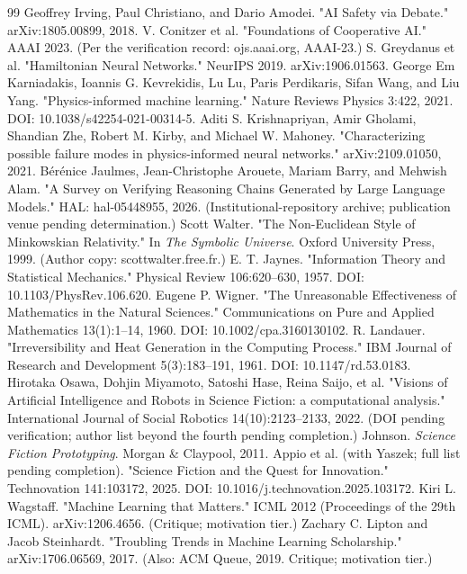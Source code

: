 \documentclass[11pt,a4paper]{article}
\begin{document}
\begin{thebibliography}{99}
 Geoffrey Irving, Paul Christiano, and Dario Amodei. "AI Safety via Debate." arXiv:1805.00899, 2018.
 V. Conitzer et al. "Foundations of Cooperative AI." AAAI 2023. (Per the verification record: ojs.aaai.org, AAAI-23.)
 S. Greydanus et al. "Hamiltonian Neural Networks." NeurIPS 2019. arXiv:1906.01563.
 George Em Karniadakis, Ioannis G. Kevrekidis, Lu Lu, Paris Perdikaris, Sifan Wang, and Liu Yang. "Physics-informed machine learning." Nature Reviews Physics 3:422, 2021. DOI: 10.1038/s42254-021-00314-5.
 Aditi S. Krishnapriyan, Amir Gholami, Shandian Zhe, Robert M. Kirby, and Michael W. Mahoney. "Characterizing possible failure modes in physics-informed neural networks." arXiv:2109.01050, 2021.
 Bérénice Jaulmes, Jean-Christophe Arouete, Mariam Barry, and Mehwish Alam. "A Survey on Verifying Reasoning Chains Generated by Large Language Models." HAL: hal-05448955, 2026. (Institutional-repository archive; publication venue pending determination.)
 Scott Walter. "The Non-Euclidean Style of Minkowskian Relativity." In \textit{The Symbolic Universe}. Oxford University Press, 1999. (Author copy: scottwalter.free.fr.)
 E. T. Jaynes. "Information Theory and Statistical Mechanics." Physical Review 106:620–630, 1957. DOI: 10.1103/PhysRev.106.620.
 Eugene P. Wigner. "The Unreasonable Effectiveness of Mathematics in the Natural Sciences." Communications on Pure and Applied Mathematics 13(1):1–14, 1960. DOI: 10.1002/cpa.3160130102.
 R. Landauer. "Irreversibility and Heat Generation in the Computing Process." IBM Journal of Research and Development 5(3):183–191, 1961. DOI: 10.1147/rd.53.0183.
 Hirotaka Osawa, Dohjin Miyamoto, Satoshi Hase, Reina Saijo, et al. "Visions of Artificial Intelligence and Robots in Science Fiction: a computational analysis." International Journal of Social Robotics 14(10):2123–2133, 2022. (DOI pending verification; author list beyond the fourth pending completion.)
 Johnson. \textit{Science Fiction Prototyping}. Morgan \& Claypool, 2011.
 Appio et al. (with Yaszek; full list pending completion). "Science Fiction and the Quest for Innovation." Technovation 141:103172, 2025. DOI: 10.1016/j.technovation.2025.103172.
 Kiri L. Wagstaff. "Machine Learning that Matters." ICML 2012 (Proceedings of the 29th ICML). arXiv:1206.4656. (Critique; motivation tier.)
 Zachary C. Lipton and Jacob Steinhardt. "Troubling Trends in Machine Learning Scholarship." arXiv:1706.06569, 2017. (Also: ACM Queue, 2019. Critique; motivation tier.)

\end{thebibliography}
\end{document}
